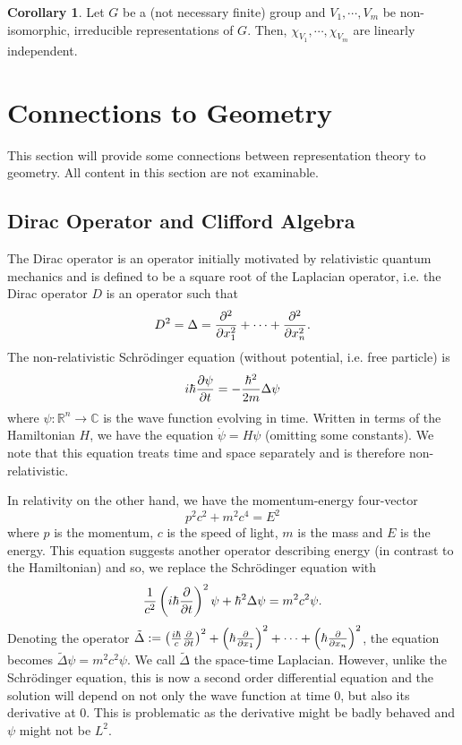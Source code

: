\documentclass[]{article}
\theoremstyle{definition}
\newtheorem{corollary}{Corollary}[theorem]
\theoremstyle{definition}
\begin{document}
\begin{corollary}
  Let \(G\) be a (not necessary finite) group and \(V_1, \cdots, V_m\) be 
  non-isomorphic, irreducible representations of \(G\). Then, 
  \(\chi_{V_1}, \cdots, \chi_{V_m}\) are linearly independent.
\end{corollary}

\newpage
\section{Connections to Geometry}

This section will provide some connections between representation theory to 
geometry. All content in this section are not examinable.

\subsection{Dirac Operator and Clifford Algebra}

The Dirac operator is an operator initially motivated by relativistic quantum 
mechanics and is defined to be a square root of the Laplacian operator, i.e. 
the Dirac operator \(D\) is an operator such that 
\[D^2 = \Delta = \pdv[2]{x_1} + \cdots + \pdv[2]{x_n}.\]
The non-relativistic Schrödinger equation (without potential, i.e. free particle) 
is 
\[i\hbar \pdv{\psi}{t} = - \frac{\hbar^2}{2m} \Delta \psi\]
where \(\psi : \mathbb{R}^n \to \mathbb{C}\) is the wave function evolving in 
time. Written in terms of the Hamiltonian \(H\), we have the equation 
\(\dot \psi = H\psi\) (omitting some constants). We note that this equation 
treats time and space separately and is therefore non-relativistic.

In relativity on the other hand, we have the momentum-energy four-vector 
\[p^2 c^2 + m^2 c^4 = E^2\]
where \(p\) is the momentum, \(c\) is the speed of light, \(m\) is the mass 
and \(E\) is the energy. This equation suggests another operator describing 
energy (in contrast to the Hamiltonian) and so, we replace the 
Schrödinger equation with
\[\frac{1}{c^2}\left(i\hbar \pdv{t}\right)^2 \psi + \hbar^2 \Delta\psi = 
  m^2c^2 \psi.\]
Denoting the operator \(\tilde \Delta := 
\left(\frac{i \hbar}{c}\pdv{t}\right)^2 + \left(\hbar \pdv{x_1}\right)^2 + \cdots 
+ \left(\hbar \pdv{x_n}\right)^2\), the equation becomes \(\tilde \Delta \psi = 
m^2 c^2 \psi\). We call \(\tilde \Delta\) the space-time Laplacian. However, 
unlike the Schrödinger equation, this is now a second order differential equation 
and the solution will depend on not only the wave function at time 0, but also 
its derivative at 0. This is problematic as the derivative might be badly behaved 
and \(\psi\) might not be \(L^2\).
\end{document}
